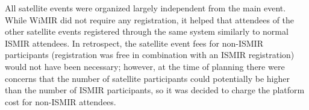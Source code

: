 \documentclass[%
10pt,								%
titlepage,						%
]
{scrartcl}
\begin{document}
    All satellite events were organized largely independent from the main event. While WiMIR did not require any registration, it helped that attendees of the other satellite events registered through the same system similarly to normal ISMIR attendees. In retrospect, the satellite event fees for non-ISMIR participants (registration was free in combination with an ISMIR registration) would not have been necessary; however, at the time of planning there were concerns that the number of satellite participants could potentially be higher than the number of ISMIR participants, so it was decided to charge the platform cost for non-ISMIR attendees.

      
\end{document}
